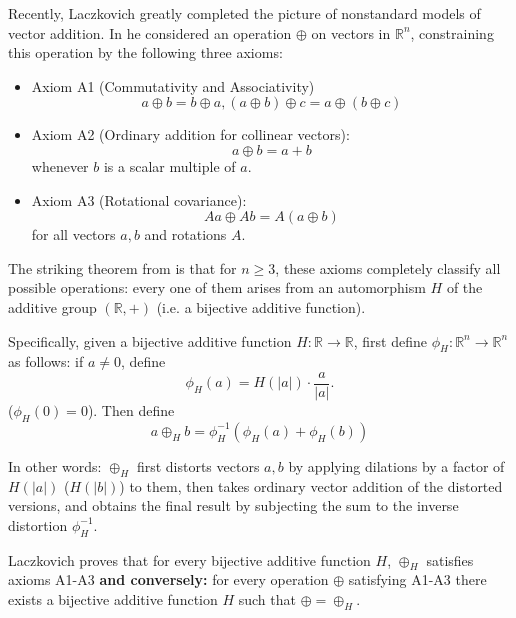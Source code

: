 \documentclass[11pt]{amsart} %
\theoremstyle{definition}
\newcommand{\R}{\mathbb{R}}
\begin{document}
Recently, Laczkovich \cite{32,33} greatly completed the picture of nonstandard models of vector addition. In \cite{32} he considered an operation $\oplus$ on vectors in $\R^n$, constraining this operation by the following three axioms: 
\begin{itemize} 
\item[-] Axiom A1 (Commutativity and Associativity)
\begin{equation} 
a\oplus b = b\oplus a, (a\oplus b)\oplus c = a\oplus (b\oplus c)
\end{equation} 
\item[-] Axiom A2 (Ordinary addition for collinear vectors): 
\begin{equation} 
a\oplus b = a+b
\end{equation} 
whenever $b$ is a scalar multiple of $a$. 
\item[-] Axiom A3 (Rotational covariance): 
\begin{equation} 
Aa\oplus Ab = A(a\oplus b) 
\end{equation} 
for all vectors $a,b$ and rotations $A$. 
\end{itemize} 

The striking theorem from \cite{32} is that for $n\geq 3$, these axioms completely classify all possible operations: every one of them arises from an automorphism $H$ of the additive group $(\R,+)$ (i.e. a bijective additive function).

Specifically, given a bijective additive function $H:\R\rightarrow \R$, first define $\phi_{H}:\R^n\rightarrow \R^n$ as follows: if $a\neq 0$, define
\begin{equation} 
\phi_{H}(a)=H(|a|)\cdot \frac{a}{|a|}. 
\end{equation} 
($\phi_{H}(0)=0$). 
Then define 
\begin{equation} 
a\oplus_{H} b = \phi_{H}^{-1}( \phi_{H}(a)+ \phi_{H}(b))
\end{equation}  

In other words: $\oplus_{H}$ first distorts vectors $a,b$ by applying dilations by a factor of $H(|a|)$ ($H(|b|)$) to them, then takes ordinary vector addition of the distorted versions, and obtains the final result by subjecting the sum to the inverse distortion $\phi_{H}^{-1}$. 

Laczkovich proves \cite{32} that for every bijective additive function $H$, $\oplus_{H}$ satisfies axioms A1-A3 \textbf{and conversely:} for every operation $\oplus$ satisfying A1-A3 there exists a bijective additive function $H$ such that $\oplus = \oplus_{H}$. 
\end{document}
